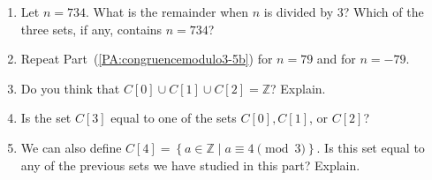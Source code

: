 \begin{previewactivity}
\begin{enumerate}
\begin{enumerate}
  \item Let  $n = 734$.  What is the remainder when  $n$ is divided by 3?  Which of the three sets, if any,  contains  $n = 734$?  
\label{PA:congruencemodulo3-5b}%

  \item Repeat Part~(\ref{PA:congruencemodulo3-5b}) for  $n = 79$ and for $n=-79$.


  \item Do you think that  
        $C[ 0 ] \cup C[ 1 ] \cup C[ 2 ] = \mathbb{Z}$?  Explain.
  \item Is the set $C[3]$ equal to one of the sets $C[0], C[1]$, or $C[2]$?
  \item We can also define $C[4] = \left\{ { {a \in \mathbb{Z} } \mid a \equiv 4 \pmod 3} \right\}\!.$  Is this set equal to any of the previous sets we have studied in this part?  Explain.
\end{enumerate}

\end{enumerate}
\end{previewactivity}
\hbreak

\endinput
